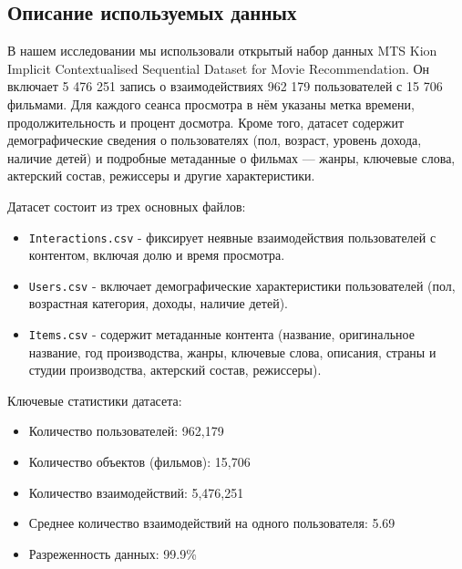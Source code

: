 \subsection*{Описание используемых данных}

В нашем исследовании мы использовали открытый набор данных MTS Kion Implicit Contextualised Sequential Dataset for Movie Recommendation. Он включает 5 476 251 запись о взаимодействиях 962 179 пользователей с 15 706 фильмами. Для каждого сеанса просмотра в нём указаны метка времени, продолжительность и процент досмотра. Кроме того, датасет содержит демографические сведения о пользователях (пол, возраст, уровень дохода, наличие детей) и подробные метаданные о фильмах — жанры, ключевые слова, актерский состав, режиссеры и другие характеристики.

Датасет состоит из трех основных файлов:
\begin{itemize}
    \item \texttt{Interactions.csv} - фиксирует неявные взаимодействия пользователей с контентом, включая долю и время просмотра.
    \item \texttt{Users.csv} - включает демографические характеристики пользователей (пол, возрастная категория, доходы, наличие детей).
    \item \texttt{Items.csv} - содержит метаданные контента (название, оригинальное название, год производства, жанры, ключевые слова, описания, страны и студии производства, актерский состав, режиссеры).
\end{itemize}

Ключевые статистики датасета:
\begin{itemize}
    \item Количество пользователей: 962,179
    \item Количество объектов (фильмов): 15,706
    \item Количество взаимодействий: 5,476,251
    \item Среднее количество взаимодействий на одного пользователя: 5.69
    \item Разреженность данных: 99.9\%
\end{itemize}

